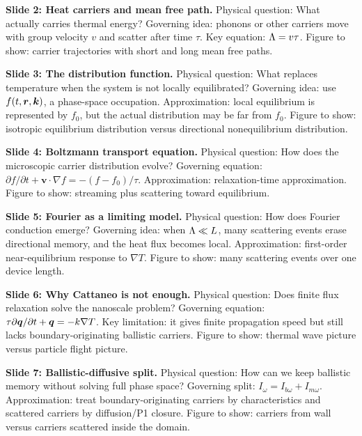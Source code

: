 \documentclass[11pt]{article}
\begin{document}
\begin{notebox}
\textbf{Slide 2: Heat carriers and mean free path.}
Physical question: What actually carries thermal energy? Governing idea: phonons or other carriers move with group velocity \(v\) and scatter after time \(\tau\). Key equation: \(\Lambda=v\tau\). Figure to show: carrier trajectories with short and long mean free paths.
\end{notebox}

\begin{notebox}
\textbf{Slide 3: The distribution function.}
Physical question: What replaces temperature when the system is not locally equilibrated? Governing idea: use \(f(t,\bm{r},\bm{k})\), a phase-space occupation. Approximation: local equilibrium is represented by \(f_0\), but the actual distribution may be far from \(f_0\). Figure to show: isotropic equilibrium distribution versus directional nonequilibrium distribution.
\end{notebox}

\begin{notebox}
\textbf{Slide 4: Boltzmann transport equation.}
Physical question: How does the microscopic carrier distribution evolve? Governing equation: \(\partial f/\partial t+\bm{v}\cdot\nabla f=-(f-f_0)/\tau\). Approximation: relaxation-time approximation. Figure to show: streaming plus scattering toward equilibrium.
\end{notebox}

\begin{notebox}
\textbf{Slide 5: Fourier as a limiting model.}
Physical question: How does Fourier conduction emerge? Governing idea: when \(\Lambda\ll L\), many scattering events erase directional memory, and the heat flux becomes local. Approximation: first-order near-equilibrium response to \(\nabla T\). Figure to show: many scattering events over one device length.
\end{notebox}

\begin{notebox}
\textbf{Slide 6: Why Cattaneo is not enough.}
Physical question: Does finite flux relaxation solve the nanoscale problem? Governing equation: \(\tau\partial\bm{q}/\partial t+\bm{q}=-k\nabla T\). Key limitation: it gives finite propagation speed but still lacks boundary-originating ballistic carriers. Figure to show: thermal wave picture versus particle flight picture.
\end{notebox}

\begin{notebox}
\textbf{Slide 7: Ballistic-diffusive split.}
Physical question: How can we keep ballistic memory without solving full phase space? Governing split: \(I_\omega=I_{b\omega}+I_{m\omega}\). Approximation: treat boundary-originating carriers by characteristics and scattered carriers by diffusion/P1 closure. Figure to show: carriers from wall versus carriers scattered inside the domain.
\end{notebox}
\end{document}

